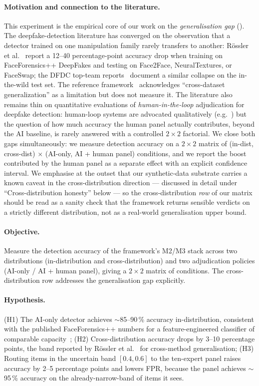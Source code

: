\documentclass[11pt,a4paper]{article}
\theoremstyle{definition}
\theoremstyle{plain}
\theoremstyle{remark}
\begin{document}
\paragraph{Motivation and connection to the literature.}
This experiment is the empirical core of our work on the
\emph{generalisation gap} (). The deepfake-detection
literature has converged on the observation that a detector
trained on one manipulation family rarely transfers to another:
R\"ossler et al.~\cite{bib5} report a 12--40 percentage-point
accuracy drop when training on FaceForensics++ DeepFakes and
testing on Face2Face, NeuralTextures, or FaceSwap; the DFDC
top-team reports~\cite{bib23} document a similar collapse on the
in-the-wild test set. The reference framework~\cite{bib4}
acknowledges ``cross-dataset generalization'' as a limitation but
does not measure it. The literature also remains thin on
quantitative evaluations of \emph{human-in-the-loop} adjudication
for deepfake detection: human-loop systems are advocated
qualitatively (e.g.~\cite{bib4,bib13}) but the question of how
much accuracy the human panel actually contributes, beyond the
AI baseline, is rarely answered with a controlled $2\!\times\!2$
factorial. We close both gaps simultaneously: we measure detection
accuracy on a $2\!\times\!2$ matrix of (in-dist, cross-dist)
$\times$ (AI-only, AI + human panel) conditions, and we report the
boost contributed by the human panel as a separate effect with an
explicit confidence interval. We emphasise at the outset that our
synthetic-data substrate carries a known caveat in the
cross-distribution direction --- discussed in detail under
``Cross-distribution honesty'' below --- so the cross-distribution
\emph{row} of our matrix should be read as a sanity check that the
framework returns sensible verdicts on a strictly different
distribution, not as a real-world generalisation upper bound.

\paragraph{Objective.}
Measure the detection accuracy of the framework's M2/M3 stack across
two distributions (in-distribution and cross-distribution) and two
adjudication policies (AI-only / AI + human panel), giving a
$2\!\times\!2$ matrix of conditions. The cross-distribution row
addresses the generalisation gap explicitly.

\paragraph{Hypothesis.}
(H1) The AI-only detector achieves $\sim$85--90\,\% accuracy
in-distribution, consistent with the published FaceForensics++
numbers for a feature-engineered classifier of comparable
capacity~\cite{bib25};
(H2) Cross-distribution accuracy drops by 3--10 percentage points,
the band reported by R\"ossler et al.\ \cite{bib5} for cross-method
generalisation;
(H3) Routing items in the uncertain band $[0.4, 0.6]$ to the
ten-expert panel raises accuracy by 2--5 percentage points and lowers
FPR, because the panel achieves $\sim$95\,\% accuracy on the
already-narrow-band of items it sees.
\end{document}
